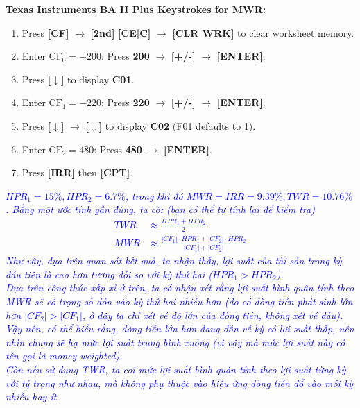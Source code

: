 \begin{tcolorbox}

\begin{examtip}
	\textbf{Texas Instruments BA II Plus Keystrokes for MWR:}
	\begin{enumerate}
		\item Press \textbf{[CF]} $\rightarrow$ \textbf{[2nd]} \textbf{[CE|C]} $\rightarrow$ \textbf{[CLR WRK]} to clear worksheet memory.
		\item Enter $\text{CF}_0 = -200$: Press \textbf{200} $\rightarrow$ \textbf{[+/-]} $\rightarrow$ \textbf{[ENTER]}.
		\item Press \textbf{[$\downarrow$]} to display \textbf{C01}.
		\item Enter $\text{CF}_1 = -220$: Press \textbf{220} $\rightarrow$ \textbf{[+/-]} $\rightarrow$ \textbf{[ENTER]}.
		\item Press \textbf{[$\downarrow$]} $\rightarrow$ \textbf{[$\downarrow$]} to display \textbf{C02} (F01 defaults to 1).
		\item Enter $\text{CF}_2 = 480$: Press \textbf{480} $\rightarrow$ \textbf{[ENTER]}.
		\item Press \textbf{[IRR]} then \textbf{[CPT]}.
	\end{enumerate}
\end{examtip}

\textcolor{blue}{\textit{
$HPR_1 = 15\%, HPR_2 = 6.7\%$, trong khi đó $MWR = IRR = 9.39\%, TWR = 10.76\%$. Bằng một ước tính gần đúng, ta có: (bạn có thể tự tính lại để kiểm tra)
\begin{align*}
	TWR & \approx \frac{HPR_1 + HPR_2}{2}\\
	MWR & \approx \frac{|CF_1|\cdot HPR_1 + |CF_2|\cdot HPR_2}{|CF_1|+|CF_2|}
\end{align*}
}}
\textcolor{blue}{\textit{Như vậy, dựa trên quan sát kết quả, ta nhận thấy, lợi suất của tài sản trong kỳ đầu tiên là cao hơn tương đối so với kỳ thứ hai ($HPR_1 > HPR_2$).\\
Dựa trên công thức xấp xỉ ở trên, ta có nhận xét rằng lợi suất bình quân tính theo MWR sẽ có trọng số dồn vào kỳ thứ hai nhiều hơn (do có dòng tiền phát sinh lớn hơn $|CF_2| > |CF_1|$, ở đây ta chỉ xét về độ lớn của dòng tiền, không xét về dấu).
Vậy nên, có thể hiểu rằng, dòng tiền lớn hơn đang dồn về kỳ có lợi suất thấp, nên nhìn chung sẽ hạ mức lợi suất trung bình xuống (vì vậy mà mức lợi suất này có tên gọi là money-weighted).\\
Còn nếu sử dụng TWR, ta coi mức lợi suất bình quân tính theo lợi suất từng kỳ với tỷ trọng như nhau, mà không phụ thuộc vào hiệu ứng dòng tiền đổ vào mỗi kỳ nhiều hay ít.
}}
\end{tcolorbox}

